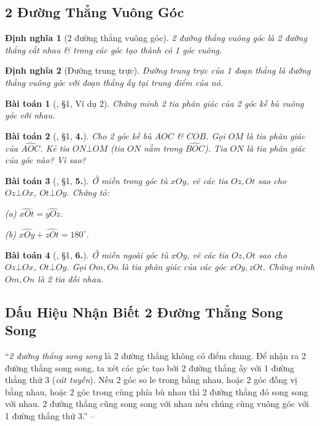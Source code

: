 \documentclass{article}
\numberwithin{equation}{section}
\newtheorem{dinhnghia}{Định nghĩa}[section]
\newtheorem{baitoan}{Bài toán}[section]
\begin{document}
\subsection{2 Đường Thẳng Vuông Góc}

\begin{dinhnghia}[2 đường thẳng vuông góc]
	\emph{2 đường thẳng vuông góc} là 2 đường thẳng cắt nhau \& trong các góc tạo thành có 1 góc vuông.
\end{dinhnghia}

\begin{dinhnghia}[Đường trung trực]
	\emph{Đường trung trực} của 1 đoạn thẳng là đường thẳng vuông góc với đoạn thẳng ấy tại trung điểm của nó.
\end{dinhnghia}

\begin{baitoan}[\cite{Binh_Toan_7_tap_1}, \S1, Ví dụ 2]
	Chứng minh 2 tia phân giác của 2 góc kề bù vuông góc với nhau.
\end{baitoan}

\begin{baitoan}[\cite{Binh_Toan_7_tap_1}, \S1, \textbf{4.}]
	Cho 2 góc kề bù $AOC$ \& $COB$. Gọi $OM$ là tia phân giác của $\widehat{AOC}$. Kẻ tia $ON\bot OM$ (tia $ON$ nằm trong $\widehat{BOC}$). Tia $ON$ là tia phân giác của góc nào? Vì sao?
\end{baitoan}

\begin{baitoan}[\cite{Binh_Toan_7_tap_1}, \S1, \textbf{5.}]
	Ở miền trong góc tù $xOy$, vẽ các tia $Oz,Ot$ sao cho $Oz\bot Ox$, $Ot\bot Oy$. Chứng tỏ:
	\begin{enumerate*}
		\item[(a)] $\widehat{xOt} = \widehat{yOz}$.
		\item[(b)] $\widehat{xOy} + \widehat{zOt} = 180^\circ$.
	\end{enumerate*}
\end{baitoan}

\begin{baitoan}[\cite{Binh_Toan_7_tap_1}, \S1, \textbf{6.}]
	Ở miền ngoài góc tù $xOy$, vẽ các tia $Oz,Ot$ sao cho $Oz\bot Ox$, $Ot\bot Oy$. Gọi $Om,On$ là tia phân giác của các góc $xOy,zOt$. Chứng minh $Om,On$ là 2 tia đối nhau.
\end{baitoan}


\subsection{Dấu Hiệu Nhận Biết 2 Đường Thẳng Song Song}
``\textit{2 đường thẳng song song} là 2 đường thẳng không có điểm chung. Để nhận ra 2 đường thẳng song song, ta xét các góc tạo bởi 2 đường thẳng ấy với 1 đường thẳng thứ 3 (\textit{cát tuyến}). Nếu 2 góc so le trong bằng nhau, hoặc 2 góc đồng vị bằng nhau, hoặc 2 góc trong cùng phía bù nhau thì 2 đường thẳng đó song song với nhau. 2 đường thẳng cũng song song với nhau nếu chúng cùng vuông góc với 1 đường thẳng thứ 3.'' -- \cite[\S6, p. 83]{Binh_Toan_7_tap_1}
\end{document}
